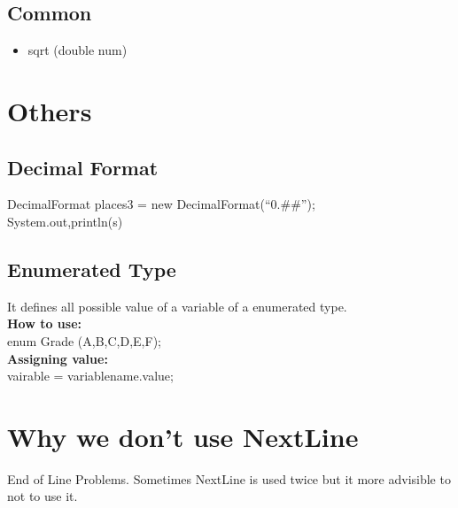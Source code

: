 \documentclass[12pt]{article}
\begin{document}
\subsection{Common}
\begin{itemize}
\item sqrt (double num)
\end{itemize}

\section{Others}
\subsection{Decimal Format}
DecimalFormat places3 = new DecimalFormat(``0.\#\#''); \\
System.out,println(s)
\subsection{Enumerated Type}
It defines all possible value of a variable of a enumerated type.\\
\textbf{How to use:} \\
enum Grade (A,B,C,D,E,F); \\
\textbf{Assigning value:} \\
vairable = variablename.value; \\
\pagebreak
\section{Why we don't use NextLine}
End of Line Problems. Sometimes NextLine is used twice but it more advisible to not to use it.
\end{document}
